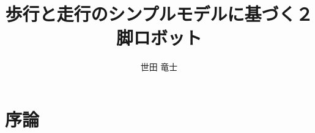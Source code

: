 \documentclass[12pt]{jarticle}
\title{歩行と走行のシンプルモデルに基づく２脚ロボット}
\author{世田 竜士}
\begin{document}
\setlength{\abovecaptionskip}{0mm}
\titlepage

\tableofcontents

\section{序論}

\clearpage

\section{}
\clearpage

\section{}

\clearpage

\section{}
\clearpage

\section{}
\clearpage

\section{}
\clearpage


\section{}
\clearpage


\Acknowledgment
\clearpage


\end{document}
